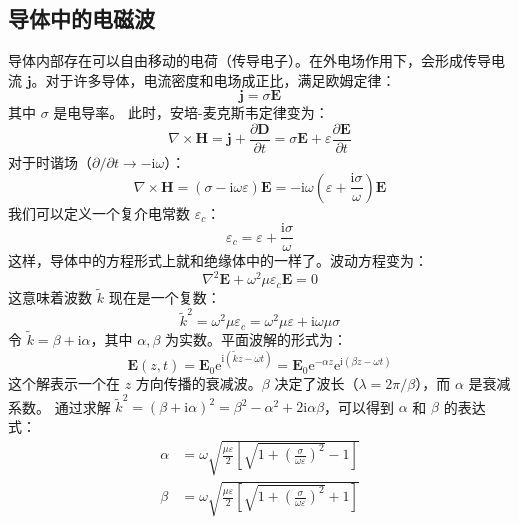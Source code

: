 \documentclass[fontset=none]{ctexart}
\begin{document}
\subsection{导体中的电磁波}
导体内部存在可以自由移动的电荷（传导电子）。在外电场作用下，会形成传导电流 $\bm{j}$。对于许多导体，电流密度和电场成正比，满足欧姆定律：
\begin{equation}
\bm{j} = \sigma \bm{E}
\end{equation}
其中 $\sigma$ 是电导率。
此时，安培-麦克斯韦定律变为：
\begin{equation}
\nabla \times \bm{H} = \bm{j} + \frac{\partial \bm{D}}{\partial t} = \sigma \bm{E} + \varepsilon \frac{\partial \bm{E}}{\partial t}
\end{equation}
对于时谐场（$\partial/\partial t \to -\mathrm{i}\omega$）：
\begin{equation}
\nabla \times \bm{H} = (\sigma - \mathrm{i}\omega\varepsilon)\bm{E} = -\mathrm{i}\omega\left(\varepsilon + \frac{\mathrm{i}\sigma}{\omega}\right)\bm{E}
\end{equation}
我们可以定义一个复介电常数 $\varepsilon_c$：
\begin{equation}
\varepsilon_c = \varepsilon + \frac{\mathrm{i}\sigma}{\omega}
\end{equation}
这样，导体中的方程形式上就和绝缘体中的一样了。波动方程变为：
\begin{equation}
\nabla^2 \bm{E} + \omega^2\mu\varepsilon_c \bm{E} = 0
\end{equation}
这意味着波数 $\tilde{k}$ 现在是一个复数：
\begin{equation}
\tilde{k}^2 = \omega^2\mu\varepsilon_c = \omega^2\mu\varepsilon + \mathrm{i}\omega\mu\sigma
\end{equation}
令 $\tilde{k} = \beta + \mathrm{i}\alpha$，其中 $\alpha, \beta$ 为实数。平面波解的形式为：
\begin{equation}
\bm{E}(z,t) = \bm{E}_0 \mathrm{e}^{\mathrm{i}(\tilde{k}z - \omega t)} = \bm{E}_0 \mathrm{e}^{-\alpha z} \mathrm{e}^{\mathrm{i}(\beta z - \omega t)}
\end{equation}
这个解表示一个在 $z$ 方向传播的衰减波。$\beta$ 决定了波长（$\lambda = 2\pi/\beta$），而 $\alpha$ 是衰减系数。
通过求解 $\tilde{k}^2 = (\beta+\mathrm{i}\alpha)^2 = \beta^2-\alpha^2+2\mathrm{i}\alpha\beta$，可以得到 $\alpha$ 和 $\beta$ 的表达式：
\begin{align}
\alpha &= \omega \sqrt{\frac{\mu\varepsilon}{2}\left[\sqrt{1+\left(\frac{\sigma}{\omega\varepsilon}\right)^2} - 1\right]} \\
\beta &= \omega \sqrt{\frac{\mu\varepsilon}{2}\left[\sqrt{1+\left(\frac{\sigma}{\omega\varepsilon}\right)^2} + 1\right]}
\end{align}
\end{document}
